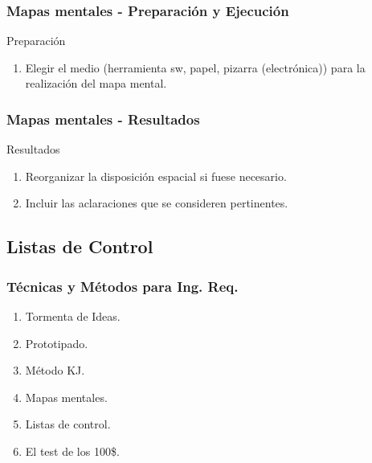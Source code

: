﻿\documentclass[handout,a4paper,slidestop,xcolor=pst,dvips,blue]{beamer}
\begin{document}
\begin{frame}[c]
    \frametitle{Mapas mentales - Preparación y Ejecución}
    \begin{block}{Preparación}
    \begin{enumerate}[<+->]
        \item Elegir el medio (herramienta sw, papel, pizarra (electrónica)) para la realización del mapa mental.
    \end{enumerate}
    \end{block}
\end{frame}

\begin{frame}[t]
    \frametitle{Mapas mentales - Resultados}
    \begin{block}{Resultados}
    \begin{enumerate}[<+->]
        \item Reorganizar la disposición espacial si fuese necesario.
        \item Incluir las aclaraciones que se consideren pertinentes.
    \end{enumerate}
    \end{block}
\end{frame}

\subsection{Listas de Control}

\begin{frame}[c]
    \frametitle{Técnicas y Métodos para Ing. Req.}
    \begin{enumerate}
         \item Tormenta de Ideas.
         \item Prototipado.
         \item Método KJ.
         \item Mapas mentales.
         \item \alert{Listas de control}.
         \item El test de los 100\$.
    \end{enumerate}
\end{frame}
\end{document}
